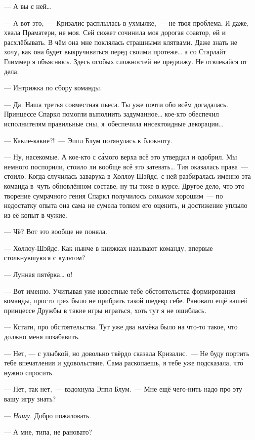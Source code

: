 \documentclass[fontsize=11pt,a5paper,titlepage=firstcover]{scrbook}
\begin{document}
--- А вы с ней{\ldots}

--- А вот это,~--- Кризалис расплылась в ухмылке,~--- не твоя проблема. И даже, хвала Праматери, не моя. Сей сюжет сочинила моя дорогая соавтор, ей и расхлёбывать. В чём она мне поклялась страшными клятвами. Даже знать не хочу, как она будет выкручиваться перед своими протеже{\ldots} а со Старлайт Глиммер я объяснюсь. Здесь особых сложностей не предвижу. Не отвлекайся от дела.

--- Интрижка по сбору команды.

--- Да. Наша третья совместная пьеса. Ты уже почти обо всём догадалась. Принцессе Спаркл помогли выполнить задуманное{\ldots} кое-кто обеспечил исполнителям правильные сны, я~обеспечила инсектоидные декорации{\ldots}

--- Какие-какие?!~--- Эппл Блум потянулась к блокноту.

--- Ну, насекомые. А кое-кто с са́мого верха всё это утвердил и одобрил. Мы немного поспорили, стоило ли вообще всё это затевать{\ldots} Тия оказалась права~--- стоило. Когда случилась заваруха в Холлоу-Шэйдс, с ней разбиралась именно эта команда в~чуть обновлённом составе, ну ты тоже в курсе. Другое дело, что это творение сумрачного гения Спаркл получилось \emph{слишком} хорошим~--- по недостатку опыта она сама не сумела толком его оценить, и достижение уплыло из её копыт в чужие.

--- Чё? Вот это вообще не поняла.

--- Холлоу-Шэйдс. Как нынче в книжках называют команду, впервые столкнувшуюся с культом?

--- Лунная пятёрка{\ldots} о!

--- Вот именно. Учитывая уже известные тебе обстоятельства формирования команды, просто грех было не прибрать такой шедевр себе. Рановато ещё вашей принцессе Дружбы в такие игры играться, хоть тут я не ошиблась.

--- Кстати, про обстоятельства. Тут уже два намёка было на что-то такое, что должно меня позабавить.

--- Нет, --- с улыбкой, но довольно твёрдо сказала Кризалис.~--- Не буду портить тебе впечатления и удовольствие. Сама раскопаешь, я тебе уже подсказала, что́ нужно спросить.

--- Нет, так нет,~--- вздохнула Эппл Блум.~--- Мне ещё чего-нить надо про эту вашу игру знать?

--- \emph{Нашу}. Добро пожаловать.

--- А мне, типа, не рановато?
\end{document}
